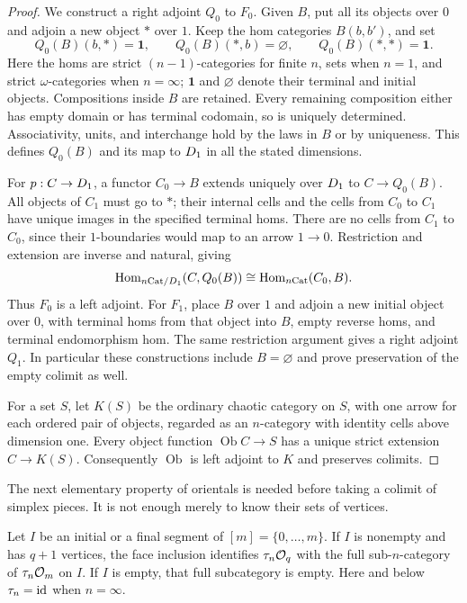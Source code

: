 \begin{proof}
We construct a right adjoint $Q_0$ to $F_0$.  Given $B$, put all its
objects over $0$ and adjoin a new object $*$ over $1$.  Keep the hom
categories $B(b,b')$, and set
\[
 Q_0(B)(b,*)=\mathbf{1},\qquad
 Q_0(B)(*,b)=\varnothing,\qquad
 Q_0(B)(*,*)=\mathbf{1}.
\]
Here the homs are strict $(n-1)$-categories for finite $n$, sets when
$n=1$, and strict $\omega$-categories when $n=\infty$; $\mathbf{1}$ and
$\varnothing$ denote their terminal and initial objects.  Compositions
inside $B$ are retained.  Every remaining composition either has empty
domain or has terminal codomain, so is uniquely determined.  Associativity,
units, and interchange hold by the laws in $B$ or by uniqueness.  This
defines $Q_0(B)$ and its map to $D_{1}$ in all the stated dimensions.

For $p:C\to D_{1}$, a functor $C_0\to B$ extends uniquely over
$D_{1}$ to $C\to Q_0(B)$.  All objects of $C_1$ must go to $*$; their
internal cells and the cells from $C_0$ to $C_1$ have unique images in the
specified terminal homs.  There are no cells from $C_1$ to $C_0$, since
their $1$-boundaries would map to an arrow $1\to0$.  Restriction and
extension are inverse and natural, giving
\[
 \operatorname{Hom}_{n\mathrm{Cat}/D_{1}}(C,Q_0(B))
 \cong \operatorname{Hom}_{n\mathrm{Cat}}(C_0,B).
\]
Thus $F_0$ is a left adjoint.  For $F_1$, place $B$ over $1$ and adjoin
a new initial object over $0$, with terminal homs from that object into
$B$, empty reverse homs, and terminal endomorphism hom.  The same
restriction argument gives a right adjoint $Q_1$.  In particular these
constructions include $B=\varnothing$ and prove preservation of the empty
colimit as well.

For a set $S$, let $K(S)$ be the ordinary chaotic category on $S$, with
one arrow for each ordered pair of objects, regarded as an $n$-category
with identity cells above dimension one.  Every object function
$\operatorname{Ob}C\to S$ has a unique strict extension $C\to K(S)$.
Consequently $\operatorname{Ob}$ is left adjoint to $K$ and preserves
colimits.
\end{proof}

The next elementary property of orientals is needed before taking a
colimit of simplex pieces.  It is not enough merely to know their sets
of vertices.

\begin{lemma}\label{lem:oriental-segments}
Let $I$ be an initial or a final segment of $[m]=\{0,\ldots,m\}$.
If $I$ is nonempty and has $q+1$ vertices, the face inclusion identifies
$\tau_n\mathcal O_{q}$ with the full sub-$n$-category of
$\tau_n\mathcal O_{m}$ on $I$.  If $I$ is empty, that full subcategory is
empty.  Here and below $\tau_n=\mathrm{id}$ when $n=\infty$.
\end{lemma}

